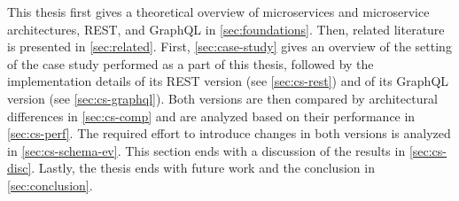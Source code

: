 
This thesis first gives a theoretical overview of microservices and microservice architectures, \ac{REST}, and GraphQL in \autoref{sec:foundations}.
Then, related literature is presented in \autoref{sec:related}.
First, \autoref{sec:case-study} gives an overview of the setting of the case study performed as a part of this thesis, followed by the implementation details of its \ac{REST} version (see \autoref{sec:cs-rest}) and of its GraphQL version (see \autoref{sec:cs-graphql}).
Both versions are then compared by architectural differences in \autoref{sec:cs-comp} and are analyzed based on their performance in \autoref{sec:cs-perf}.
The required effort to introduce changes in both versions is analyzed in \autoref{sec:cs-schema-ev}.
This section ends with a discussion of the results in \autoref{sec:cs-disc}.
Lastly, the thesis ends with future work and the conclusion in \autoref{sec:conclusion}.
